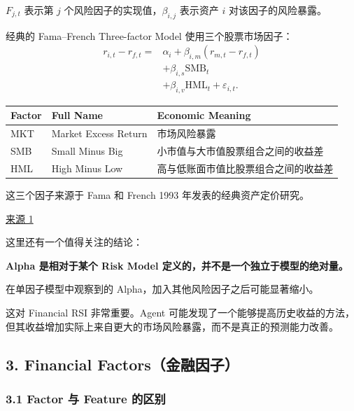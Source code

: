 \(F_{j,t}\) 表示第 \(j\) 个风险因子的实现值，\(\beta_{i,j}\) 表示资产 \(i\) 对该因子的风险暴露。

经典的 Fama--French Three-factor Model 使用三个股票市场因子：
\[\begin{aligned}
r_{i,t}-r_{f,t}
={}&\alpha_i
+\beta_{i,m}(r_{m,t}-r_{f,t})\\
&+\beta_{i,s}\mathrm{SMB}_t\\
&+\beta_{i,v}\mathrm{HML}_t
+\varepsilon_{i,t}.
\end{aligned}\]

\begin{readertable}
\begin{longtable}[]{@{}
  >{\raggedright\arraybackslash}p{}
  >{\raggedright\arraybackslash}p{}
  >{\raggedright\arraybackslash}p{}@{}}
\toprule
Factor & Full Name & Economic Meaning \\
\midrule
\endhead
MKT & Market Excess Return & 市场风险暴露 \\
SMB & Small Minus Big & 小市值与大市值股票组合之间的收益差 \\
HML & High Minus Low & 高与低账面市值比股票组合之间的收益差 \\
\bottomrule
\end{longtable}
\end{readertable}

这三个因子来源于 Fama 和 French 1993 年发表的经典资产定价研究。

\href{https://doi.org/10.1016/0304-405X\%2893\%2990023-5}{来源 1}

这里还有一个值得关注的结论：

\textbf{Alpha 是相对于某个 Risk Model 定义的，并不是一个独立于模型的绝对量。}

在单因子模型中观察到的 Alpha，加入其他风险因子之后可能显著缩小。

这对 Financial RSI 非常重要。Agent 可能发现了一个能够提高历史收益的方法，但其收益增加实际上来自更大的市场风险暴露，而不是真正的预测能力改善。

\hypertarget{part-4-63-0001-financial-factorsux91d1ux878dux56e0ux5b50}{%
\subsection{3. Financial Factors（金融因子）}\label{part-4-63-0001-financial-factorsux91d1ux878dux56e0ux5b50}}

\hypertarget{part-4-63-0001-factor-ux4e0e-feature-ux7684ux533aux522b}{%
\subsubsection{3.1 Factor 与 Feature 的区别}\label{part-4-63-0001-factor-ux4e0e-feature-ux7684ux533aux522b}}


